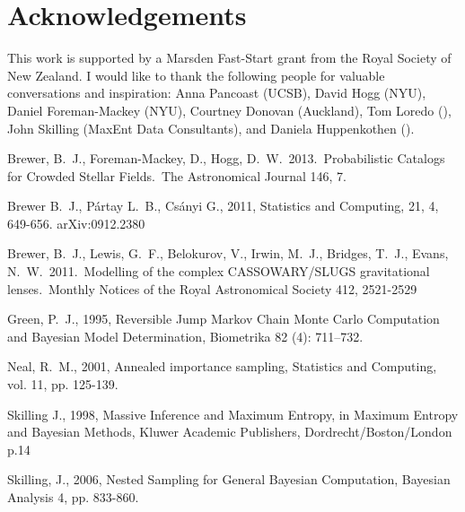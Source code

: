 \documentclass[letterpaper, 11pt]{article}
\begin{document}




\section*{Acknowledgements}
This work is supported by a Marsden Fast-Start grant
from the Royal Society of New Zealand. I would like to thank the following
people for valuable conversations and inspiration:
Anna Pancoast (UCSB), David Hogg (NYU), Daniel Foreman-Mackey (NYU),
Courtney Donovan (Auckland), Tom Loredo (),
John Skilling (MaxEnt Data Consultants), and Daniela Huppenkothen ().


\begin{thebibliography}{}

 Brewer, B.~J., 
Foreman-Mackey, D., Hogg, D.~W.\ 2013.\ Probabilistic Catalogs for Crowded 
Stellar Fields.\ The Astronomical Journal 146, 7. 

 Brewer B.~J., P{\'a}rtay L.~B., Cs{\'a}nyi G., 2011,
Statistics and Computing, 21, 4, 649-656. arXiv:0912.2380

 Brewer, B.~J., Lewis,
G.~F., Belokurov, V., Irwin, M.~J., Bridges, T.~J., Evans, N.~W.\ 2011.\
Modelling of the complex CASSOWARY/SLUGS gravitational lenses.\ Monthly
Notices of the Royal Astronomical Society 412, 2521-2529

Green, P.~J., 1995, Reversible Jump Markov Chain Monte Carlo Computation and Bayesian Model Determination, Biometrika 82 (4): 711–732.

 Neal, R.~M., 2001, 
Annealed importance sampling, Statistics and Computing, vol. 11, pp. 125-139.

Skilling J., 1998, Massive Inference and Maximum Entropy, in Maximum Entropy
and Bayesian Methods, Kluwer Academic Publishers, Dordrecht/Boston/London p.14

 Skilling, J., 2006, Nested Sampling for General Bayesian Computation, Bayesian Analysis 4, pp. 833-860.


\end{thebibliography}
\end{document}
